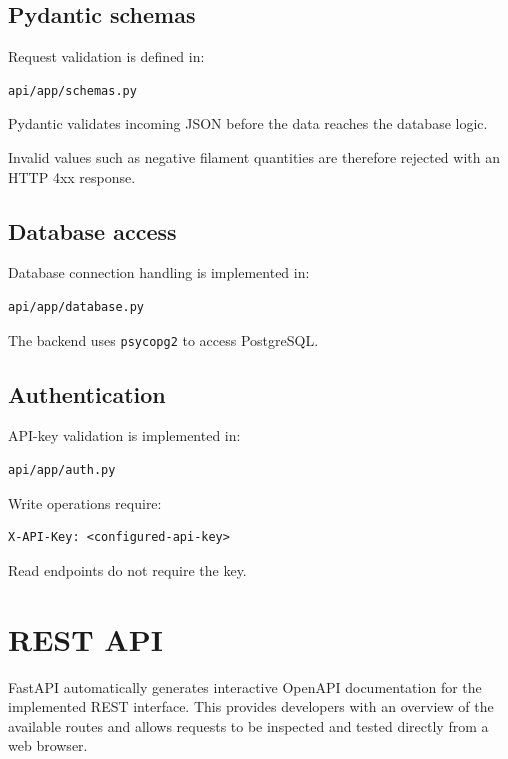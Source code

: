 \documentclass[a4paper,11pt]{article}
\begin{document}
\subsection{Pydantic schemas}

Request validation is defined in:

\begin{lstlisting}
api/app/schemas.py
\end{lstlisting}

Pydantic validates incoming JSON before the data reaches the database logic.

Invalid values such as negative filament quantities are therefore rejected
with an HTTP 4xx response.

\subsection{Database access}

Database connection handling is implemented in:

\begin{lstlisting}
api/app/database.py
\end{lstlisting}

The backend uses \texttt{psycopg2} to access PostgreSQL.

\subsection{Authentication}

API-key validation is implemented in:

\begin{lstlisting}
api/app/auth.py
\end{lstlisting}

Write operations require:

\begin{lstlisting}
X-API-Key: <configured-api-key>
\end{lstlisting}

Read endpoints do not require the key.

\section{REST API}

FastAPI automatically generates interactive OpenAPI documentation for the
implemented REST interface. This provides developers with an overview of the
available routes and allows requests to be inspected and tested directly from
a web browser.
\end{document}
